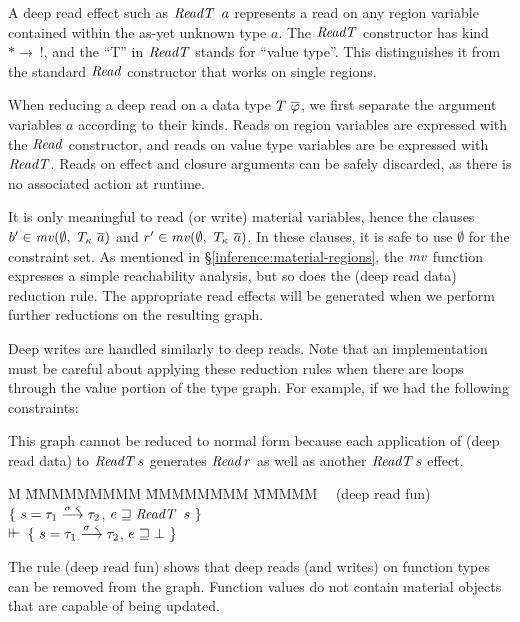 A deep read effect such as $\iReadT \ a$ represents a read on any region variable contained within the as-yet unknown type $a$. The $\operatorname{\mathit{ReadT}}$ constructor has kind $* \to \ !$, and the ``T'' in $\operatorname{\mathit{ReadT}}$ stands for ``value type''. This distinguishes it from the standard $\operatorname{\mathit{Read}}$ constructor that works on single regions.

When reducing a deep read on a data type $T \ \overline{\varphi}$, we first separate the argument variables $a$ according to their kinds. Reads on region variables are expressed with the $\operatorname{\mathit{Read}}$ constructor, and reads on value type variables are be expressed with $\operatorname{\mathit{ReadT}}$. Reads on effect and closure arguments can be safely discarded, as there is no associated action at runtime.

It is only meaningful to read (or write) material variables, hence the clauses \mbox{$b' \in \imv(\emptyset, \ T_{\kappa} \ \ov{a})$} and \mbox{$r' \in \operatorname{\mathit{mv}}(\emptyset, \ T_{\kappa} \ \overline{a})$}. In these clauses, it is safe to use $\emptyset$ for the constraint set. As mentioned in \S\ref{inference:material-regions}, the $\operatorname{\mathit{mv}}$ function expresses a simple reachability analysis, but so does the (deep read data) reduction rule. The appropriate read effects will be generated when we perform further reductions on the resulting graph.

Deep writes are handled similarly to deep reads. Note that an implementation must be careful about applying these reduction rules when there are loops through the value portion of the type graph. For example, if we had the following constraints:


This graph cannot be reduced to normal form because each application of (deep read data) to $\operatorname{\mathit{ReadT}} s$ generates $\operatorname{\mathit{Read}} r$ as well as another $\operatorname{\mathit{ReadT}} s$ effect.

\begin{tabbing}
	M \= MMMMMMMMM \= MMMMMMMM \= MMMMM \kill
	\> \ \ (deep read fun)	\> $\{ \ s = \tau_1 \stackrel{\sigma \ \varsigma}{\longrightarrow} \tau_2$, 
				\> $e \tme \iReadT \ s \ \}$ 
	\\
	\> \qq \qq $\vdash\mkern-6mu\vdash$	\> $\{ \ s = \tau_1 \stackrel{\sigma \ \varsigma}{\longrightarrow} \tau_2$, 
				\> $e \sqsupseteq \bot \ \}$ 
\end{tabbing}

The rule (deep read fun) shows that deep reads (and writes) on function types can be removed from the graph. Function values do not contain material objects that are capable of being updated.


